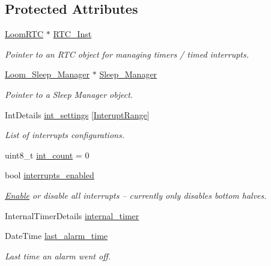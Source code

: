 \subsection*{Protected Attributes}
\begin{DoxyCompactItemize}
\item 
\hyperlink{class_loom_r_t_c}{Loom\+R\+TC} $\ast$ \hyperlink{class_loom___interrupt___manager_af209a82a1929466fa1d00a14733120c6}{R\+T\+C\+\_\+\+Inst}
\begin{DoxyCompactList}\small\item\em Pointer to an R\+TC object for managing timers / timed interrupts. \end{DoxyCompactList}\item 
\hyperlink{class_loom___sleep___manager}{Loom\+\_\+\+Sleep\+\_\+\+Manager} $\ast$ \hyperlink{class_loom___interrupt___manager_a1afa84cd52b350fcc4a48ec2e45431a9}{Sleep\+\_\+\+Manager}
\begin{DoxyCompactList}\small\item\em Pointer to a Sleep Manager object. \end{DoxyCompactList}\item 
Int\+Details \hyperlink{class_loom___interrupt___manager_a8b625720d3238492bc51a301e4e9b09a}{int\+\_\+settings} \mbox{[}\hyperlink{_interrupt___manager_8h_a3fbf8a43703481c17414cec74c056c5a}{Interupt\+Range}\mbox{]}
\begin{DoxyCompactList}\small\item\em List of interrupts configurations. \end{DoxyCompactList}\item 
uint8\+\_\+t \hyperlink{class_loom___interrupt___manager_a0c79ea059f94d9ec26c4b58d3c945754}{int\+\_\+count} = 0
\item 
bool \hyperlink{class_loom___interrupt___manager_a042032ad0c2ed2748e1d2849dcae1a2f}{interrupts\+\_\+enabled}
\begin{DoxyCompactList}\small\item\em \hyperlink{namespace_enable}{Enable} or disable all interrupts -- currently only disables bottom halves. \end{DoxyCompactList}\item 
Internal\+Timer\+Details \hyperlink{class_loom___interrupt___manager_a9a00f26aff65a7294699d3518a3b7e74}{internal\+\_\+timer}
\item 
Date\+Time \hyperlink{class_loom___interrupt___manager_a099eebe8ec30cee46432701945b0e758}{last\+\_\+alarm\+\_\+time}
\begin{DoxyCompactList}\small\item\em Last time an alarm went off. \end{DoxyCompactList}\item 

\end{DoxyCompactItemize}
